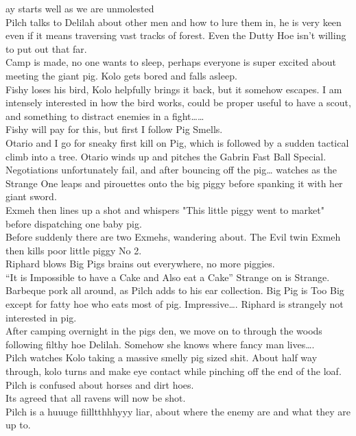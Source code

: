 ay starts well as we are unmolested\\
Pilch talks to Delilah about other men and how to lure them in, he is very keen even if it means traversing vast tracks of forest. Even the Dutty Hoe isn’t willing to put out that far.\\
Camp is made, no one wants to sleep, perhaps everyone is super excited about meeting the giant pig. Kolo gets bored and falls asleep.\\
Fishy loses his bird, Kolo helpfully brings it back, but it somehow escapes. I am intensely interested in how the bird works, could be proper useful to have a scout, and something to distract enemies in a fight……\\
Fishy will pay for this, but first I follow Pig Smells.\\
Otario and I go for sneaky first kill on Pig, which is followed by a sudden tactical climb into a tree. Otario winds up and pitches the Gabrin Fast Ball Special. Negotiations unfortunately fail, and after bouncing off the pig… watches as the Strange One leaps and pirouettes onto the big piggy before spanking it with her giant sword.\\
Exmeh then lines up a shot and whispers "This little piggy went to market" before dispatching one baby pig.\\
Before suddenly there are two Exmehs, wandering about. The Evil twin Exmeh then kills poor little piggy No 2.\\
Riphard blows Big Pigs brains out everywhere, no more piggies.\\
“It is Impossible to have a Cake and Also eat a Cake” Strange on is Strange.\\
Barbeque pork all around, as Pilch adds to his ear collection. Big Pig is Too Big except for fatty hoe who eats most of pig. Impressive…. Riphard is strangely not interested in pig.\\
After camping overnight in the pigs den, we move on to through the woods following filthy hoe Delilah. Somehow she knows where fancy man lives….\\
Pilch watches Kolo taking a massive smelly pig sized shit. About half way through, kolo turns and make eye contact while pinching off the end of the loaf.\\
Pilch is confused about horses and dirt hoes.\\
Its agreed that all ravens will now be shot.\\
Pilch is a huuuge fiilltthhhyyy liar, about where the enemy are and what they are up to.\\
